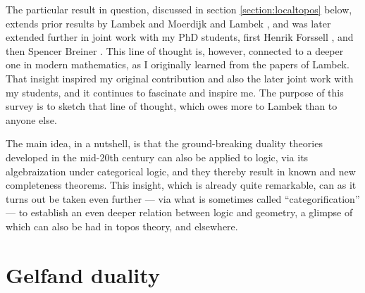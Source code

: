 \documentclass[12pt]{article}
\theoremstyle{remark}
\theoremstyle{definition}
\begin{document}
The particular result in question, discussed in section \ref{section:localtopos} below, extends prior results by Lambek and Moerdijk \cite{LM} and Lambek \cite{L2}, and was later extended further in joint work with my  PhD students, first Henrik Forssell \cite{AF}, and then Spencer Breiner \cite{B}.  This line of thought is, however, connected to a deeper one in modern mathematics, as I originally learned from the papers of Lambek.  That insight inspired  my  original contribution and also the later joint work with my students, and it continues to fascinate and inspire me.   The purpose of this survey is to sketch that line of thought, which owes more to Lambek than to anyone else.  

The main idea, in a nutshell, is that the ground-breaking duality theories developed in the mid-20th century can also be applied to logic, via its algebraization under categorical logic, and they thereby result in known and new completeness theorems.  This insight, which is already quite remarkable, can as it turns out be taken even further --- via what is sometimes called ``categorification'' --- to establish an even deeper relation between logic and geometry, a glimpse of which can also be had in topos theory, and elsewhere.

\section{Gelfand duality}
\end{document}
